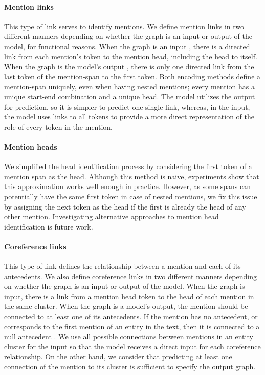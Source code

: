 \documentclass[11pt]{article}
\begin{document}
\paragraph{Mention links} This type of link serves to identify mentions. 
We define mention links in two different manners depending on whether the graph is an input or output of the model, for functional reasons. When the graph is an input , there is a directed link from each mention's token to the mention head, including the head to itself. 
When the graph is the model's output , there is only one directed link from the last token of the mention-span to the first token. 
Both encoding methods define a mention-span uniquely, even when having nested mentions; every mention has a unique start-end combination and a unique head. The model utilizes the output for prediction, so it is simpler to predict one single link, whereas, in the input, the model uses links to all tokens to provide a more direct representation of the role of every token in the mention.
	
\paragraph{Mention heads} We simplified the head identification process by considering the first token of a mention span as the head. Although this method is naive, experiments show that this approximation works well enough in practice. However, as some spans can potentially have the same first token in case of nested mentions, we fix this issue by assigning the next token as the head if the first is already the head of any other mention. 
Investigating alternative approaches to mention head identification is future work.


\paragraph{Coreference links}  This type of link defines the relationship between a mention and each of its antecedents. We also define coreference links in two different manners depending on whether the graph is an input or output of the model. When the graph is input, there is a link from a mention head token to the head of each mention in the same cluster. 
When the graph is a model's output, the mention should be connected to at least one of its antecedents. If the mention has no antecedent, or corresponds to the first mention of an entity in the text, then it is connected to a null antecedent . 
We use all possible connections between mentions in an entity cluster for the input so that the model receives a direct input for each coreference relationship. On the other hand, we consider that predicting at least one connection of the mention to its cluster is sufficient to specify the output graph.
\end{document}
